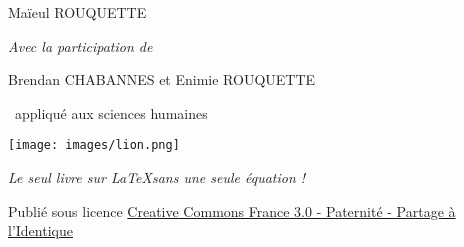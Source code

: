 \newpage\begin{center}
\parindent=0pt

{\Large Maïeul ROUQUETTE}
\vspace{0.5ex}

{\footnotesize \emph{Avec la participation de}}

\vspace{0.5ex}

{Brendan CHABANNES et Enimie ROUQUETTE}

\vspace{8ex}
{\LARGE\logo~appliqué aux sciences humaines}

\vspace{10ex}
\texttt{[image: images/lion.png]}
\vspace{3ex}

{\large \emph{Le seul livre sur \LaTeX sans une seule équation !}}

\vspace{28ex}



{\small Publié sous licence \href{http://creativecommons.org/licenses/by-sa/3.0/fr/}{Creative Commons France 3.0 - Paternité - Partage à l'Identique}}
\end{center}
\newpage
